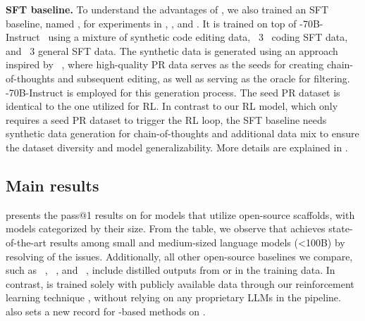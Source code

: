 \textbf{SFT baseline.}
To understand the advantages of \tech, we also trained an SFT baseline, named \oursft[70], for experiments in , , and .
It is trained on top of -70B-Instruct~\cite{llama31} using a mixture of
synthetic code editing data, \llama~3~\cite{llama31} coding SFT data, and \llama~3 general SFT data.
The synthetic data is generated using an approach inspired by \magicoder~\cite{magicoder}, where high-quality PR data serves as the seeds for creating chain-of-thoughts and subsequent editing, as well as serving as the oracle for filtering. -70B-Instruct is employed for this generation process.
The seed PR dataset is identical to the one utilized for RL.
In contrast to our RL model, which only requires a seed PR dataset to trigger the RL loop, the SFT baseline needs synthetic data generation for chain-of-thoughts and additional data mix to ensure the dataset diversity and model generalizability.
More details are explained in .


\subsection{Main results}
\label{subsec:maineval}
 presents the pass@1 results on \swebverified for models that utilize open-source scaffolds, with models categorized by their size.
From the table, we observe that \ours[70] achieves state-of-the-art results among small and medium-sized language models (<100B) by resolving \swebfinalbig{\%} of the issues.
Additionally, all other open-source baselines we compare, such as \swegpt~\cite{swegpt}, \swegym~\cite{swegym}, and \swefixer~\cite{swefixer}, include distilled outputs from  or \sonnet in the training data.
In contrast, \ours is trained solely with publicly available data through our reinforcement learning technique \tech, without relying on any proprietary LLMs in the pipeline.
\ours also sets a new record for \llama-based methods on \swebench.


